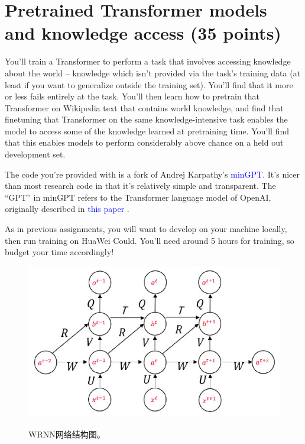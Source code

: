 \documentclass[letterpaper,12pt]{article}
\begin{document}
		
	

			
	
	\section{Pretrained Transformer models and knowledge access (35 points)}
	
	You’ll train a Transformer to perform a task that involves accessing knowledge about the world – knowledge which isn’t provided via the task’s training data (at least if you want to generalize outside the training set). You’ll find that it more or less fails entirely at the task. You’ll then learn how to pretrain that Transformer on Wikipedia text that contains world knowledge, and find that finetuning that Transformer on the same knowledge-intensive task enables the model to access some of the knowledge learned at pretraining time. You’ll find that this enables models to perform considerably above chance on a held out development set.
	
	The code you’re provided with is a fork of Andrej Karpathy’s \textcolor{blue}{minGPT}. It’s nicer than most research code in that it’s relatively simple and transparent. The “GPT” in minGPT refers to the Transformer language model of OpenAI, originally described in \textcolor{blue}{this paper} \cite{b1}.
	
	As in previous assignments, you will want to develop on your machine locally, then run training on HuaWei Could. You’ll need around 5 hours for training, so budget your time accordingly!
	
	\begin{figure}[htbp] 
		\centering 
		\includegraphics[width=0.5\linewidth]{network}
		\captionsetup{font=scriptsize}
		\label{network}
		\captionsetup{font=scriptsize}
		\caption{
			\label{fig: WRNN_network} %
			WRNN网络结构图。
		}
	\end{figure}
\end{document}
